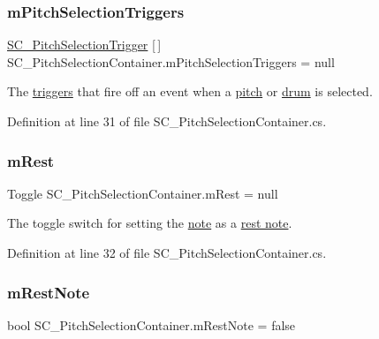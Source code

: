 \subsubsection{\texorpdfstring{m\+Pitch\+Selection\+Triggers}{mPitchSelectionTriggers}}
{\footnotesize\ttfamily \hyperlink{class_s_c___pitch_selection_trigger}{S\+C\+\_\+\+Pitch\+Selection\+Trigger} \mbox{[}$\,$\mbox{]} S\+C\+\_\+\+Pitch\+Selection\+Container.\+m\+Pitch\+Selection\+Triggers = null\hspace{0.3cm}{\ttfamily [private]}}



The \hyperlink{group___doc_s_c___p_s_t}{triggers} that fire off an event when a \hyperlink{group___music_enums_ga508f69b199ea518f935486c990edac1d}{pitch} or \hyperlink{group___music_enums_gade475b4382c7066d1af13e7c13c029b6}{drum} is selected. 



Definition at line 31 of file S\+C\+\_\+\+Pitch\+Selection\+Container.\+cs.

\mbox{\label{group___s_c___p_s_c_priv_var_gae4378d4e0b53501eb0f55b8af38a5a8c}} 
\subsubsection{\texorpdfstring{m\+Rest}{mRest}}
{\footnotesize\ttfamily Toggle S\+C\+\_\+\+Pitch\+Selection\+Container.\+m\+Rest = null\hspace{0.3cm}{\ttfamily [private]}}



The toggle switch for setting the \hyperlink{group___music_structs_struct_music_1_1_combined_note}{note} as a \hyperlink{group___doc_s_c___p_s_c_DocSC_PSCRest}{rest note}. 



Definition at line 32 of file S\+C\+\_\+\+Pitch\+Selection\+Container.\+cs.

\mbox{\label{group___s_c___p_s_c_priv_var_ga6eec175f775c35e2d0eb51dfe6def49f}} 
\subsubsection{\texorpdfstring{m\+Rest\+Note}{mRestNote}}
{\footnotesize\ttfamily bool S\+C\+\_\+\+Pitch\+Selection\+Container.\+m\+Rest\+Note = false\hspace{0.3cm}{\ttfamily [private]}}



